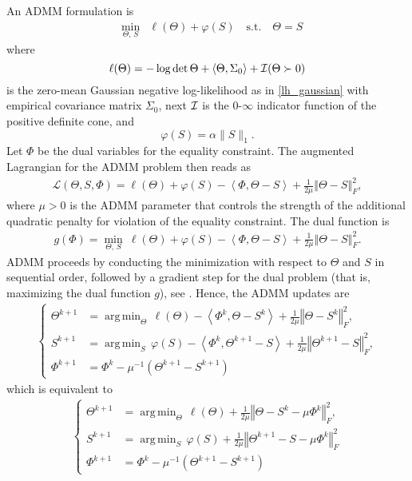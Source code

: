 \documentclass{article}
\newcommand{\IR}{{\mathbb{R}}}\newcommand{\IN}{{\mathbb{N}}}
\newcommand{\bNorm}[1]{\left\Vert #1\right\Vert} %
\newcommand{\scalp}[1]{ \left\langle #1\right\rangle} %
\DeclareMathOperator{\logdet}{log\,det}
\DeclareMathOperator{\argmin}{arg\,min}
\begin{document}
An ADMM formulation is
\begin{equation}
\begin{array}{lrlr}
&\underset{\Theta,\,S} {\min}& \ell(\Theta) + \varphi(S) \quad \textrm{s.t.} \quad\Theta = S
\end{array}
\end{equation}
where
\[\ell(\Theta) = -\logdet \Theta + \scalp{\Theta, \Sigma_0} + \I( \Theta\succ0)\]
is the zero-mean Gaussian negative log-likelihood as in \eqref{lh_gaussian} with empirical covariance matrix $\Sigma_0$, next $\mathcal{I}$ is the $0$-$\infty$ indicator function of the positive definite cone, and
\[\varphi(S) =  \alpha \|S\|_{1}.\]
Let $\Phi$ %
be the dual variables for the equality constraint.
The augmented Lagrangian for the ADMM problem then reads as
\begin{align}
 \mathcal{L}(\Theta, S, \Phi) = \ell(\Theta) + \varphi(S) - \scalp{\Phi, \Theta - S} + \frac{1}{2\mu}\bNorm{\Theta - S}_F^2,
\end{align}
where $\mu > 0$ is the ADMM parameter that controls the strength of the additional quadratic penalty for violation of the equality constraint.
The dual function is 
\begin{align}
 g(\Phi) = \min_{\Theta,\,S} \: \ell(\Theta) + \varphi(S) - \scalp{\Phi, \Theta - S} + \frac{1}{2\mu}\bNorm{\Theta - S}_F^2.
\end{align}
ADMM proceeds by conducting the minimization with respect to $\Theta$ and $S$ in sequential order, followed by a gradient step for the dual problem (that is, maximizing the dual function $g$), see \cite{boyd2011distributed}.
Hence, the ADMM updates are
\begin{align*}
	\begin{cases}\Theta^{k+1} &= \argmin_\Theta \, \ell(\Theta) - \scalp{\Phi^k, \Theta - S^k} + \frac{1}{2\mu}\bNorm{\Theta - S^k}_F^2, \\
		S^{k+1} &= \argmin_S \,\varphi(S) - \scalp{\Phi^k, \Theta^{k+1} - S} + \frac{1}{2\mu}\bNorm{\Theta^{k+1} - S}_F^2, \\
		\Phi^{k+1} &= \Phi^k - \mu^{-1}(\Theta^{k+1} - S^{k+1})\end{cases}
\end{align*}
which is equivalent to
\begin{align}
	\begin{cases}\Theta^{k+1} &= \argmin_\Theta \, \ell(\Theta)  + \frac{1}{2\mu}\bNorm{\Theta - S^k - \mu\Phi^k}_F^2, \\
		S^{k+1} &= \argmin_S \,\varphi(S) + \frac{1}{2\mu}\bNorm{\Theta^{k+1} - S - \mu\Phi^k}_F^2 \\
		\Phi^{k+1} &= \Phi^k - \mu^{-1}(\Theta^{k+1} - S^{k+1})\end{cases} \label{PADMM}
\end{align}
\end{document}
